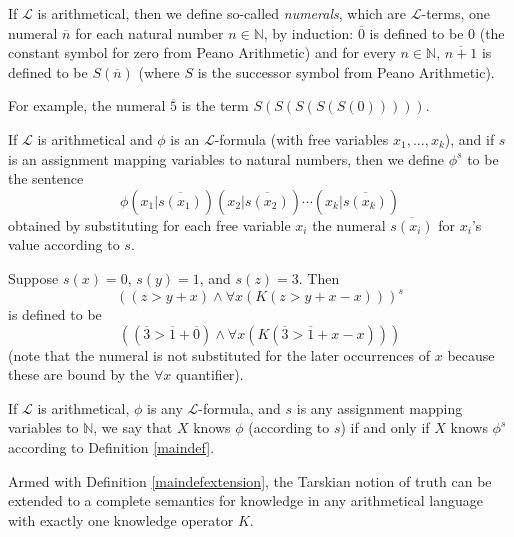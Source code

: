 \documentclass[runningheads]{llncs}
\begin{document}
\begin{definition}
  If $\mathscr L$ is arithmetical, then we define so-called \emph{numerals}, which
  are $\mathscr L$-terms, one numeral $\overline n$ for each natural number $n\in\mathbb N$,
  by induction: $\overline 0$ is defined to be $0$ (the constant symbol for zero from
  Peano Arithmetic) and
  for every $n\in\mathbb N$, $\overline{n+1}$ is defined to be $S(\overline n)$
  (where $S$ is the successor symbol from Peano Arithmetic).
\end{definition}

For example, the numeral $\overline 5$ is the term $S(S(S(S(S(0)))))$.

\begin{definition}
  If $\mathscr L$ is arithmetical and $\phi$ is an $\mathscr L$-formula (with free variables
  $x_1,\ldots,x_k$),
  and if $s$ is an assignment mapping variables to natural numbers, then we define $\phi^s$
  to be the sentence
  \[
    \phi(x_1|\overline{s(x_1)})(x_2|\overline{s(x_2)})\cdots (x_k|\overline{s(x_k)})
  \]
  obtained by substituting for each free variable $x_i$ the numeral $\overline{s(x_i)}$
  for $x_i$'s value according to $s$.
\end{definition}

\begin{example}
  Suppose $s(x)=0$, $s(y)=1$, and $s(z)=3$. Then
  \[
  ((z>y+x) \wedge \forall x(K(z>y+x-x)))^s
  \]
  is defined to be
  \[
  ((\overline 3 > \overline 1+\overline 0)
  \wedge \forall x( K( \overline 3 > \overline 1 + x - x ) ))
  \]
  (note that the numeral is not substituted for the later occurrences of $x$ because
  these are bound by the $\forall x$ quantifier).
\end{example}

\begin{definition}
\label{maindefextension}
  If $\mathscr L$ is arithmetical, $\phi$ is any $\mathscr L$-formula,
  and $s$ is any assignment mapping variables to $\mathbb N$,
  we say that $X$ knows $\phi$ (according to $s$) if and only if
  $X$ knows $\phi^s$ according to Definition \ref{maindef}.
\end{definition}

Armed with Definition \ref{maindefextension}, the Tarskian notion
\cite{sep-tarski-truth} of
truth can be extended to a complete semantics for
knowledge in any arithmetical language with exactly one knowledge operator $K$.
\end{document}
